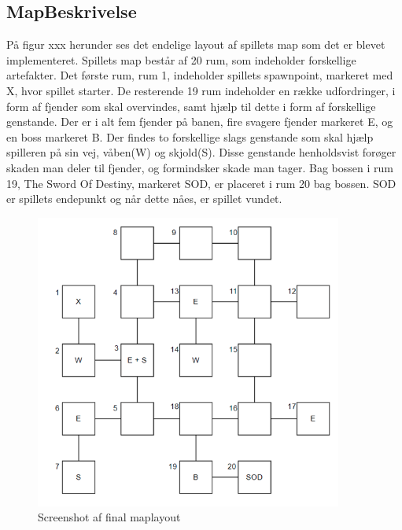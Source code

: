 \subsection{MapBeskrivelse}

På figur xxx herunder ses det endelige layout af spillets map som det er blevet implementeret. 
Spillets map består af 20 rum, som indeholder forskellige artefakter.  
Det første rum, rum 1, indeholder spillets spawnpoint, markeret med X, hvor spillet starter.  
De resterende 19 rum indeholder en række udfordringer, i form af fjender som skal overvindes, samt hjælp til dette i form af forskellige genstande. 
Der er i alt fem fjender på banen, fire svagere fjender markeret E, og en boss markeret B. 
Der findes to forskellige slags genstande som skal hjælp spilleren på sin vej, våben(W) og skjold(S).  
Disse genstande henholdsvist forøger skaden man deler til fjender, og formindsker skade man tager. 
Bag bossen i rum 19, 
The Sword Of Destiny, markeret SOD, er placeret i rum 20 bag bossen. SOD er spillets endepunkt og når dette nåes, er spillet vundet.



\begin{figure}[H]
\centering
\includegraphics[width = 0.9\textwidth]{02-Body/Images/MapLayout.PNG}
\caption{Screenshot af final maplayout}
\label{fig:MapLayout-final}
\end{figure}